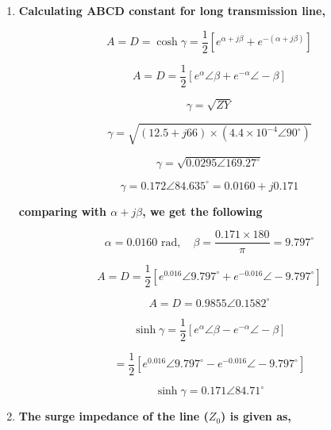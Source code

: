 \documentclass[12pt]{article}
\begin{document}
	\renewcommand{\labelenumi}{(\textbf{\roman{enumi}})}
	\begin{enumerate}
	\item \textbf{Calculating ABCD constant for long transmission line,} 
	
	\begin{equation}
		A = D = \cosh \gamma = \frac{1}{2} \left[ e^{\alpha + j\beta} + e^{-(\alpha + j\beta)} \right]
	\end{equation}
	
	\[ A = D = \frac{1}{2} \left[ e^{\alpha} \angle \beta + e^{-\alpha} \angle -\beta \right] \]
	
	\begin{equation}
		\gamma = \sqrt{ZY}
	\end{equation}
	
	\[ \gamma = \sqrt{(12.5 + j66) \times (4.4 \times 10^{-4} \angle 90^\circ)} \]
	
	\[ \gamma = \sqrt{0.0295 \angle 169.27^\circ} \]
	
	\begin{equation}
		\gamma = 0.172 \angle 84.635^\circ = 0.0160 + j0.171
	\end{equation}
	
	
	
	
	\textbf{comparing with $\alpha + j\beta$, we get the following}
	
	\[ \alpha = 0.0160 \text{ rad}, \quad \beta = \frac{0.171 \times 180}{\pi} = 9.797^\circ \]
	
	\begin{equation}
		A = D = \frac{1}{2} \left[ e^{0.016} \angle 9.797^\circ + e^{-0.016} \angle -9.797^\circ \right]
	\end{equation}
	
	\begin{equation}
		A = D = 0.9855 \angle 0.1582^\circ
	\end{equation}
	
	\begin{equation}
		\sinh \gamma = \frac{1}{2} \left[ e^{\alpha} \angle \beta - e^{-\alpha} \angle -\beta \right]
	\end{equation}
	
	\[ = \frac{1}{2} \left[ e^{0.016} \angle 9.797^\circ - e^{-0.016} \angle -9.797^\circ \right] \]
	
	\begin{equation}
		\sinh \gamma = 0.171 \angle 84.71^\circ
	\end{equation}
	

	\item \textbf{The surge impedance of the line (\(Z_0\)) is given as, }
	

\end{enumerate}
\end{document}
